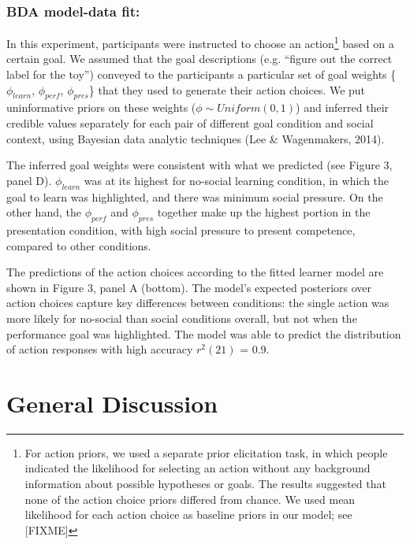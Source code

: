 \documentclass[10pt, letterpaper]{article}
\begin{document}
\subsubsection{BDA model-data fit:}\label{bda-model-data-fit}

In this experiment, participants were instructed to choose an
action\footnote{For action priors, we used a separate prior elicitation task, in which people indicated the likelihood for selecting an action without any background information about possible hypotheses or goals. The results suggested that none of the action choice priors differed from chance. We used mean likelihood for each action choice as baseline priors in our model; see [FIXME]}
based on a certain goal. We assumed that the goal descriptions (e.g.
``figure out the correct label for the toy'') conveyed to the
participants a particular set of goal weights \{\(\phi_{learn}\),
\(\phi_{perf}\), \(\phi_{pres}\)\} that they used to generate their
action choices. We put uninformative priors on these weights
(\(\phi \sim Uniform(0,1)\)) and inferred their credible values
separately for each pair of different goal condition and social context,
using Bayesian data analytic techniques (Lee \& Wagenmakers, 2014).

The inferred goal weights were consistent with what we predicted (see
Figure 3, panel D). \(\phi_{learn}\) was at its highest for no-social
learning condition, in which the goal to learn was highlighted, and
there was minimum social pressure. On the other hand, the
\(\phi_{perf}\) and \(\phi_{pres}\) together make up the highest portion
in the presentation condition, with high social pressure to present
competence, compared to other conditions.

The predictions of the action choices according to the fitted learner
model are shown in Figure 3, panel A (bottom). The model's expected
posteriors over action choices capture key differences between
conditions: the single action was more likely for no-social than social
conditions overall, but not when the performance goal was highlighted.
The model was able to predict the distribution of action responses with
high accuracy \(r^2(21)\) = 0.9.

\section{General Discussion}\label{general-discussion}
\end{document}
